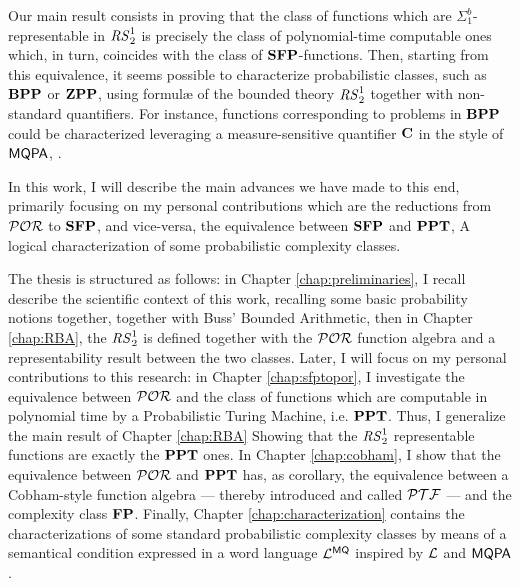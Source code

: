 %
%
%
%
%
%
%
%

Our main result consists in proving
that the class of functions which are
$\Sigma^b_1$-representable in ${\mathit{RS}^1_2}$
is precisely the class of polynomial-time computable
ones which, in turn, coincides with the
class of $\mathbf{SFP}$-functions.
%
%
%
%
Then, starting from this equivalence,
it seems possible to characterize probabilistic classes,
such as $\mathbf{BPP}$ or $\mathbf{ZPP}$,
using formul\ae{} of the bounded theory ${\mathit{RS}^1_2}$
together with non-standard quantifiers.
%
For instance, functions corresponding to problems
in $\mathbf{BPP}$ could be characterized leveraging a
measure-sensitive quantifier $\mathbf{C}$ in the style of $\mathsf{MQPA}$, \cite{ADLP,ADLP21}.
%

In this work, I will describe the main advances we have made to this end,
primarily focusing on my personal contributions which
are the reductions from $\mathcal{POR}$ to $\mathbf{SFP}$,
and vice-versa, the equivalence between $\mathbf{SFP}$ and $\mathbf{PPT}$,
A logical characterization of some probabilistic complexity classes.

The thesis is structured as follows: in Chapter \ref{chap:preliminaries},
I recall describe the scientific context of this work,
recalling some basic probability notions together, together with Buss'
Bounded Arithmetic, then in Chapter \ref{chap:RBA}, the ${\mathit{RS}^1_2}$ is defined
together with the $\mathcal{POR}$ function algebra and a representability result between
the two classes. Later, I will focus on my personal contributions to this research:
in Chapter \ref{chap:sfptopor}, I investigate the equivalence between $\mathcal{POR}$ and
the class of functions which are computable in polynomial time by a Probabilistic
Turing Machine, i.e. $\mathbf{PPT}$. Thus, I generalize the main result of Chapter \ref{chap:RBA}
Showing that the ${\mathit{RS}^1_2}$ representable functions are exactly the $\mathbf{PPT}$ ones.
In Chapter \ref{chap:cobham}, I show that the equivalence between $\mathcal{POR}$ and
$\mathbf{PPT}$ has, as corollary, the equivalence between a Cobham-style function algebra ---
thereby introduced and called $\mathcal{PTF}$ --- and the complexity class $\mathbf{FP}$. Finally, Chapter
\ref{chap:characterization} contains the characterizations of some standard
probabilistic complexity classes by means of a semantical condition expressed
in a word language $\mathcal{L}^{\mathsf{MQ}}$ inspired by $\mathcal{L}$ and $\mathsf{MQPA}$.
